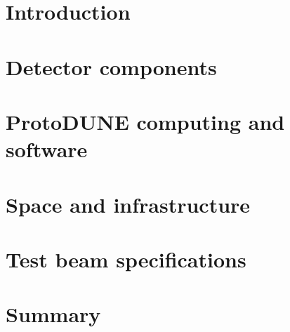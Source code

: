 \ifdefined\isfinal\documentclass[final]{pd-tdr}\else\documentclass{pd-tdr}\fi
\begin{document}



\chapter{Introduction}


\chapter{Detector components} 


\chapter{ProtoDUNE computing and software}


\chapter{Space and infrastructure}


\chapter{Test beam specifications} 


\chapter{Summary}
%

\cleardoublepage


\end{document}
